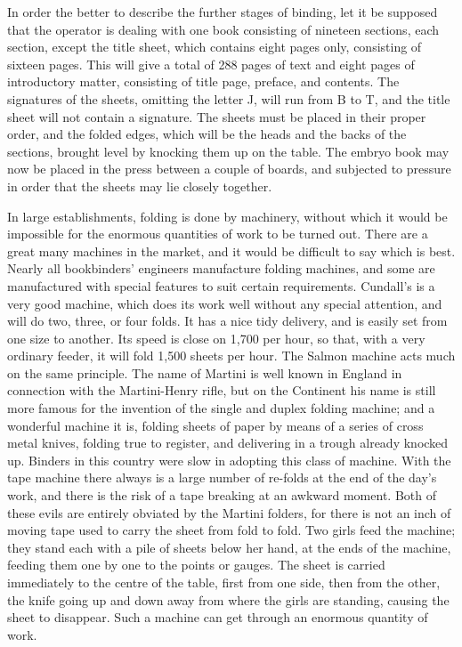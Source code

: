 \documentclass[twoside]{book}
\begin{document}
In order the better to describe the further stages
of binding, let it be supposed that the operator is
dealing with one book consisting of nineteen sections,
each section, except the title sheet, which
contains eight pages only, consisting of sixteen
pages. This will give a total of 288 pages of text
and eight pages of introductory matter, consisting of
title page, preface, and contents. The signatures
of the sheets, omitting the letter J, will run from
B to T, and the title sheet will not contain a
signature. The sheets must be placed in their proper
order, and the folded edges, which will be the
heads and the backs of the sections, brought level
by knocking them up on the table. The embryo
book may now be placed in the press between a
couple of boards, and subjected to pressure in order
that the sheets may lie closely together.

In large establishments, folding is done by
machinery, without which it would be impossible
\pagebreak
for the enormous quantities of work to be turned
out. There are a great many machines in the
market, and it would be difficult to say which is
best. Nearly all bookbinders' engineers manufacture
folding machines, and some are manufactured
with special features to suit certain requirements.
Cundall's is a very good machine, which does its
work well without any special attention, and will
do two, three, or four folds. It has a nice tidy
delivery, and is easily set from one size to another.
Its speed is close on 1,700 per hour, so that, with
a very ordinary feeder, it will fold 1,500 sheets per
hour. The Salmon machine acts much on the same
principle. The name of Martini is well known in
England in connection with the Martini-Henry
rifle, but on the Continent his name is still more
famous for the invention of the single and duplex
folding machine; and a wonderful machine it is,
folding sheets of paper by means of a series of
cross metal knives, folding true to register, and
delivering in a trough already knocked up. Binders
in this country were slow in adopting this class of
machine. With the tape machine there always is
a large number of re-folds at the end of the day's
work, and there is the risk of a tape breaking at an
awkward moment. Both of these evils are entirely
obviated by the Martini folders, for there is not an
inch of moving tape used to carry the sheet from
fold to fold. Two girls feed the machine; they
stand each with a pile of sheets below her hand,
at the ends of the machine, feeding them one by
one to the points or gauges. The sheet is carried
immediately to the centre of the table, first from
one side, then from the other, the knife going up
and down away from where the girls are standing,
causing the sheet to disappear. Such a machine
can get through an enormous quantity of work.
\end{document}
